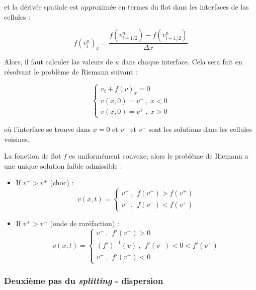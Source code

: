 \noindent et la dérivée spatiale est approximée en termes du flot dans les interfaces de las cellules :

\begin{equation*}
f(v_i^n)_x = \frac{f\left(v_{i+1/2}^n\right) - f\left(v_{i-1/2}^n\right)}{\Delta x}
\end{equation*}

\indent Alors, il faut calculer las valeurs de $u$ dans chaque interface. Cela sera fait en résolvant le problème de Riemann suivant :

\begin{equation*}
\begin{cases}
v_t + f(v)_x = 0 \\
v(x,0) = v^- \ , \ x < 0 \\
v(x,0) = v^+ \ , \ x > 0
\end{cases}
\end{equation*}

\noindent où l'interface se trouve dans $x=0$ et $v^-$ et $v^+$ sont les solutions dans les cellules voisines.

\indent La fonction de flot $f$ es uniformément convexe; alors le problème de Riemann a une unique solution faible admissible  \cite{conservationLaws2002} :

\begin{itemize}
\item  If $v^- > v^+$  (choc) : 
\begin{equation*}
v(x,t) = 
\begin{cases}
v^- \ ,\ \   f(v^-) > f(v^+) \\
v^+ \ ,\ \ f(v^-) < f(v^+)
\end{cases}
\end{equation*}

\item If $v^+ > v^-$  (onde de raréfaction) :
\begin{equation*}
v(x,t) = 
\begin{cases}
v^- \ ,\ \ f'(v^-) > 0 \\
\left(f'\right)^{-1}(v) \ ,\ \ f'(v^-) < 0 < f'(v^+) \\
v^+ \ ,\ \ f'(v^+) < 0 
\end{cases}
\end{equation*}
\end{itemize}


\subsubsection{Deuxième pas du \emph{splitting} - dispersion}


